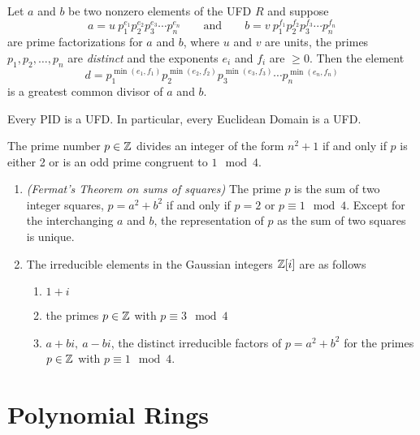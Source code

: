 \nl

\begin{prop}
Let $a$ and $b$ be two nonzero elements of the UFD $R$ and suppose
\[a = u\ p_1^{e_1}p_2^{e_2}p_3^{e_3}\cdots p_n^{e_n}\qquad\text{and}\qquad b = v\ p_1^{f_1}p_2^{f_2}p_3^{f_3}\cdots p_n^{f_n}\]
are prime factorizations for $a$ and $b$, where $u$ and $v$ are units, the primes $p_1,p_2,\ldots,p_n$ are \textit{distinct} and the exponents $e_i$ and $f_i$ are $\geq 0$. Then the element 
\[d = p_1^{\min(e_1,f_1)}p_2^{\min(e_2,f_2)}p_3^{\min(e_3,f_3)}\cdots p_n^{\min(e_n,f_n)}\]
is a greatest common divisor of $a$ and $b$. 
\end{prop}

\nl

\begin{thm}
Every PID is a UFD. In particular, every Euclidean Domain is a UFD. 
\end{thm}

\nl

\begin{lem}
The prime number $p\in \mathbb{Z}$ divides an integer of the form $n^2 + 1$ if and only if $p$ is either 2 or is an odd prime congruent to $1\mod 4$.
\end{lem}

\nl

\begin{prop}\nl
\begin{enumerate}
\item \textit{(Fermat's Theorem on sums of squares)} The prime $p$ is the sum of two integer squares, $p = a^2 + b^2$ if and only if $p = 2$ or $p\equiv 1\mod 4$. Except for the interchanging $a$ and $b$, the representation of $p$ as the sum of two squares is unique. 
\item The irreducible elements in the Gaussian integers $\mathbb{Z}[i]$ are as follows
\begin{enumerate}
\item $1 + i$
\item the primes $p\in \mathbb{Z}$ with $p\equiv 3\mod 4$
\item $a + bi,\ a-bi$, the distinct irreducible factors of $p = a^2 + b^2$ for the primes $p\in \mathbb{Z}$ with $p\equiv 1\mod 4$.
\end{enumerate}
\end{enumerate}
\end{prop}


\section{Polynomial Rings}
\setcounter{thm}{0}


